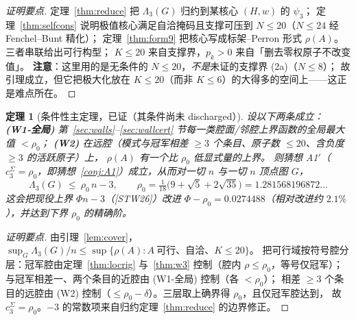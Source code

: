 \documentclass[UTF8,11pt]{ctexart}
\newtheorem{theorem}{定理}[section]
\theoremstyle{definition}
\newcommand{\Lam}{\Lambda}
\newcommand{\STW}{\textup{[STW26]}}
\begin{document}
\begin{proof}[证明要点]
定理~\ref{thm:reduce} 把 $\Lam_3(G)$ 归约到某核心 $(H,w)$ 的 $\psi_3$；
定理~\ref{thm:selfcons} 说明极值核心满足自洽掩码且支撑可压到 $N\le20$（$N\le24$ 经 Fenchel--Bunt 精化）；
定理~\ref{thm:form9} 把核心写成标架--Perron 形式 $\rho(A)$。三者串联给出可行构型；
$K\le20$ 来自支撑界，$p_k>0$ 来自「删去零权原子不改变值」。
\textbf{注意}：这里用的是无条件的 $N\le20$，\emph{不是}未证的支撑界 (2a)（$N\le8$）；
故引理成立，但它把极大化放在 $K\le20$（而非 $K\le6$）的大得多的空间上——这正是难点所在。
\end{proof}

\begin{theorem}[条件性主定理，已证（其条件尚未 discharged）]\label{thm:assemble}
设以下两条成立：
\textbf{(W1-全局)} 第~\ref{sec:walls}--\ref{sec:wallcert} 节每一类腔面/邻腔上界函数的\emph{全局}最大值 $<\rho_0$；
\textbf{(W2)} 在远腔（模式与冠军相差 $\ge3$ 个条目、原子数 $\le20$、含负度 $\ge3$ 的活跃原子）上，
$\rho(A)$ 有一个比 $\rho_0$ 低\emph{显式量}的上界。
则猜想 A1$'$（$c_3^{\Sigma}=\rho_0$，即猜想~\ref{conj:A1}）成立，从而对一切 $n$ 与一切 $n$ 顶点图 $G$，
\[
\Lam_3(G)\ \le\ \rho_0\,n-3,\qquad \rho_0=\tfrac1{18}\bigl(9+\sqrt5+2\sqrt{35}\bigr)=1.281568196872\ldots
\]
这会把现役上界 $\Phi n-3$（\STW）改进 $\Phi-\rho_0=0.0274488$（相对改进约 $2.1\%$），并达到下界 $\rho_0$ 的精确阶。
\end{theorem}

\begin{proof}[证明要点]
由引理~\ref{lem:cover}，$\sup_G\Lam_3(G)/n\le\sup\{\rho(A):A\ \text{可行、自洽、}K\le20\}$。
把可行域按符号腔分层：冠军腔由定理~\ref{thm:locrig} 与~\ref{thm:w3} 控制（腔内 $\rho\le\rho_0$，等号仅冠军）；
与冠军相差一、两个条目的近腔由 (W1-全局) 控制（各 $<\rho_0$）；
相差 $\ge3$ 个条目的远腔由 (W2) 控制（$\le\rho_0-\delta$）。三层取上确界得 $\rho_0$，且仅冠军腔达到，
故 $c_3^{\Sigma}=\rho_0$。$-3$ 的常数项来自归约定理~\ref{thm:reduce} 的边界修正。
\end{proof}
\end{document}
